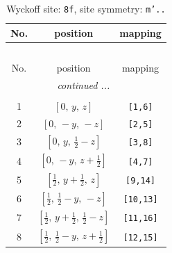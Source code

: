 \documentclass[fleqn,8pt]{jsarticle}
\begin{document}
\begin{longtable}{ccc}
\caption{Wyckoff site: {\tt 8f}, site symmetry: {\tt m'..}}
 \\
 \hline \hline
No. & position & mapping \\ \hline \endfirsthead

\multicolumn{2}{l}{\tablename\ \thetable{}} \\
 \hline \hline
No. & position & mapping \\ \hline \endhead

 \hline \hline
\multicolumn{2}{r}{\footnotesize\it continued ...} \\ \endfoot

 \hline \hline
\multicolumn{2}{r}{} \\ \endlastfoot

1 & $\left[ 0,\, y,\, z \right]$ & {\tt [1,6]} \\ \hline
2 & $\left[ 0,\, - y,\, - z \right]$ & {\tt [2,5]} \\ \hline
3 & $\left[ 0,\, y,\, \frac{1}{2} - z \right]$ & {\tt [3,8]} \\ \hline
4 & $\left[ 0,\, - y,\, z + \frac{1}{2} \right]$ & {\tt [4,7]} \\ \hline
5 & $\left[ \frac{1}{2},\, y + \frac{1}{2},\, z \right]$ & {\tt [9,14]} \\ \hline
6 & $\left[ \frac{1}{2},\, \frac{1}{2} - y,\, - z \right]$ & {\tt [10,13]} \\ \hline
7 & $\left[ \frac{1}{2},\, y + \frac{1}{2},\, \frac{1}{2} - z \right]$ & {\tt [11,16]} \\ \hline
8 & $\left[ \frac{1}{2},\, \frac{1}{2} - y,\, z + \frac{1}{2} \right]$ & {\tt [12,15]} \\
\end{longtable}
\renewcommand{\arraystretch}{1.2}
\end{document}
